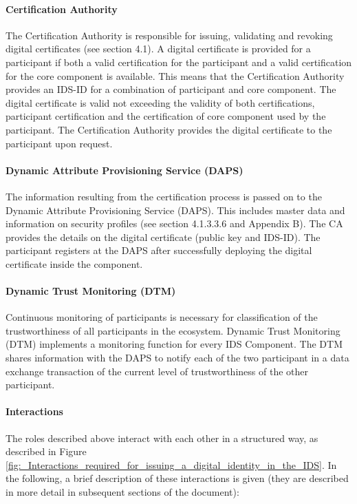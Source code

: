 \paragraph{Certification Authority} %
The Certification Authority is responsible for issuing, validating and revoking digital certificates (see section 4.1). A digital certificate is provided for a participant if both a valid certification for the participant and a valid certification for the core component is available. This means that the Certification Authority provides an IDS-ID for a combination of participant and core component. The digital certificate is valid not exceeding the validity of both certifications, participant certification and the certification of core component used by the participant. The Certification Authority provides the digital certificate to the participant upon request.


\paragraph{Dynamic Attribute Provisioning Service (DAPS)} %
The information resulting from the certification process is passed on to the Dynamic Attribute Provisioning Service (DAPS). This includes master data and information on security profiles (see section 4.1.3.3.6 and Appendix B).  The CA provides the details on the digital certificate (public key and IDS-ID). The participant registers at the DAPS after successfully deploying the digital certificate inside the component.


\paragraph{Dynamic Trust Monitoring (DTM)}
Continuous monitoring of participants is necessary for classification of the trustworthiness of all participants in the ecosystem. Dynamic Trust Monitoring (DTM) implements a monitoring function for every IDS Component. The DTM shares information with the DAPS to notify each of the two participant in a data exchange transaction of the current level of trustworthiness of the other participant.


\paragraph{Interactions}
The roles described above interact with each other in a structured way, as described in Figure \ref{fig:_Interactions_required_for_issuing_a_digital_identity_in_the_IDS}. In the following, a brief description of these interactions is given (they are described in more detail in subsequent sections of the document): 


